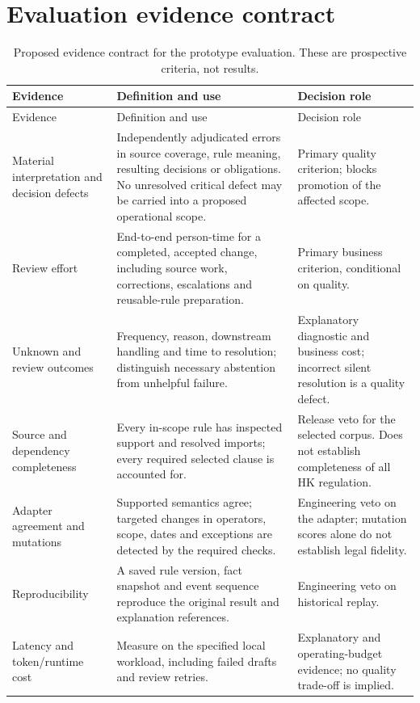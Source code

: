 \section{Evaluation evidence contract}
\begingroup\small
\begin{longtable}{P{0.25\textwidth}P{0.39\textwidth}P{0.26\textwidth}}
\caption{Proposed evidence contract for the prototype evaluation. These are
prospective criteria, not results.}\label{tab:evaluation-detail}\\
\toprule Evidence & Definition and use & Decision role \\\midrule
\endfirsthead
\toprule Evidence & Definition and use & Decision role \\\midrule
\endhead
Material interpretation and decision defects & Independently adjudicated errors
in source coverage, rule meaning, resulting decisions or obligations. No unresolved
critical defect may be carried into a proposed operational scope. & Primary quality
criterion; blocks promotion of the affected scope.\\
Review effort & End-to-end person-time for a completed, accepted change, including
source work, corrections, escalations and reusable-rule preparation. & Primary
business criterion, conditional on quality.\\
Unknown and review outcomes & Frequency, reason, downstream handling and time to
resolution; distinguish necessary abstention from unhelpful failure. & Explanatory
diagnostic and business cost; incorrect silent resolution is a quality defect.\\
Source and dependency completeness & Every in-scope rule has inspected support and
resolved imports; every required selected clause is accounted for. & Release veto
for the selected corpus. Does not establish completeness of all HK regulation.\\
Adapter agreement and mutations & Supported semantics agree; targeted changes in
operators, scope, dates and exceptions are detected by the required checks. &
Engineering veto on the adapter; mutation scores alone do not establish legal fidelity.\\
Reproducibility & A saved rule version, fact snapshot and event sequence reproduce
the original result and explanation references. & Engineering veto on historical replay.\\
Latency and token/runtime cost & Measure on the specified local workload, including
failed drafts and review retries. & Explanatory and operating-budget evidence; no
quality trade-off is implied.\\
\bottomrule
\end{longtable}
\endgroup


